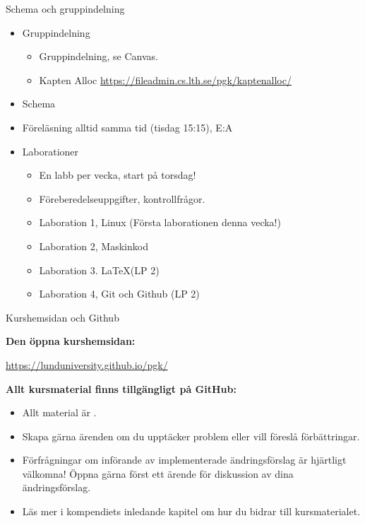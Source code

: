 \ifkompendium\else  %


\begin{Slide}{Schema och gruppindelning}

  \begin{itemize}
    \item Gruppindelning
          \begin{itemize}
            \item Gruppindelning, se Canvas.
            \item Kapten Alloc \url{https://fileadmin.cs.lth.se/pgk/kaptenalloc/}
          \end{itemize}
    \item Schema
    \item Föreläsning alltid samma tid (tisdag 15:15), E:A
    \item Laborationer
          \begin{itemize}
            \item En labb per vecka, start på torsdag!
            \item Föreberedelseuppgifter, kontrollfrågor.
            \item Laboration 1, Linux (Första laborationen denna vecka!)
            \item Laboration 2, Maskinkod
            \item Laboration 3. \LaTeX (LP 2)
            \item Laboration 4, Git och Github (LP 2)
          \end{itemize}
  \end{itemize}
\end{Slide}

\begin{Slide}{Kurshemsidan och Github}

  {\bf Den öppna kurshemsidan:}

  \smallskip
  \small\url{https://lunduniversity.github.io/pgk/}


  \bigskip


  {\bf Allt kursmaterial finns tillgängligt på GitHub:}


  \smallskip
  \begin{itemize}
    \item Allt material är .
    \item Skapa gärna ärenden  om du upptäcker problem eller vill föreslå förbättringar.
    \item Förfrågningar om införande av implementerade ändringsförslag  är hjärtligt välkomna! Öppna gärna först ett ärende för diskussion av dina ändringsförslag.
    \item Läs mer i kompendiets inledande kapitel om hur du bidrar till kursmaterialet.
  \end{itemize}
\end{Slide}

